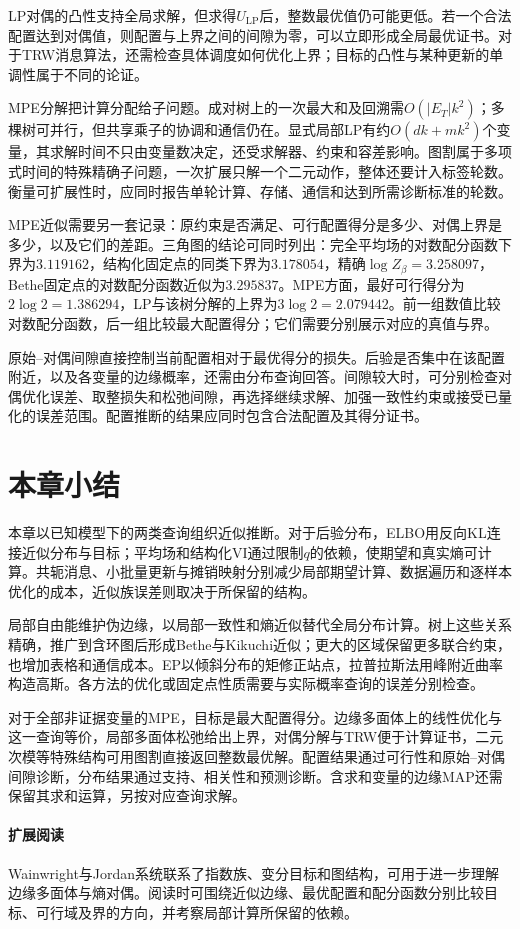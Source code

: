 LP对偶的凸性支持全局求解，但求得$U_{\mathrm{LP}}$后，整数最优值仍可能更低。若一个合法配置达到对偶值，则配置与上界之间的间隙为零，可以立即形成全局最优证书。对于TRW消息算法，还需检查具体调度如何优化上界；目标的凸性与某种更新的单调性属于不同的论证。

MPE分解把计算分配给子问题。成对树上的一次最大和及回溯需$O(|E_T|k^2)$；多棵树可并行，但共享乘子的协调和通信仍在。显式局部LP有约$O(dk+mk^2)$个变量，其求解时间不只由变量数决定，还受求解器、约束和容差影响。图割属于多项式时间的特殊精确子问题，一次扩展只解一个二元动作，整体还要计入标签轮数。衡量可扩展性时，应同时报告单轮计算、存储、通信和达到所需诊断标准的轮数。

MPE近似需要另一套记录：原约束是否满足、可行配置得分是多少、对偶上界是多少，以及它们的差距。三角图的结论可同时列出：完全平均场的对数配分函数下界为$3.119162$，结构化固定点的同类下界为$3.178054$，精确$\log Z_\beta=3.258097$，Bethe固定点的对数配分函数近似为$3.295837$。MPE方面，最好可行得分为$2\log2=1.386294$，LP与该树分解的上界为$3\log2=2.079442$。前一组数值比较对数配分函数，后一组比较最大配置得分；它们需要分别展示对应的真值与界。

原始--对偶间隙直接控制当前配置相对于最优得分的损失。后验是否集中在该配置附近，以及各变量的边缘概率，还需由分布查询回答。间隙较大时，可分别检查对偶优化误差、取整损失和松弛间隙，再选择继续求解、加强一致性约束或接受已量化的误差范围。配置推断的结果应同时包含合法配置及其得分证书。

\section{本章小结}
\label{sec:pgm-variational-summary}

本章以已知模型下的两类查询组织近似推断。对于后验分布，ELBO用反向KL连接近似分布与目标；平均场和结构化VI通过限制$q$的依赖，使期望和真实熵可计算。共轭消息、小批量更新与摊销映射分别减少局部期望计算、数据遍历和逐样本优化的成本，近似族误差则取决于所保留的结构。

局部自由能维护伪边缘，以局部一致性和熵近似替代全局分布计算。树上这些关系精确，推广到含环图后形成Bethe与Kikuchi近似；更大的区域保留更多联合约束，也增加表格和通信成本。EP以倾斜分布的矩修正站点，拉普拉斯法用峰附近曲率构造高斯。各方法的优化或固定点性质需要与实际概率查询的误差分别检查。

对于全部非证据变量的MPE，目标是最大配置得分。边缘多面体上的线性优化与这一查询等价，局部多面体松弛给出上界，对偶分解与TRW便于计算证书，二元次模等特殊结构可用图割直接返回整数最优解。配置结果通过可行性和原始--对偶间隙诊断，分布结果通过支持、相关性和预测诊断。含求和变量的边缘MAP还需保留其求和运算，另按对应查询求解。

\paragraph{扩展阅读}
Wainwright与Jordan系统联系了指数族、变分目标和图结构，可用于进一步理解边缘多面体与熵对偶。阅读时可围绕近似边缘、最优配置和配分函数分别比较目标、可行域及界的方向，并考察局部计算所保留的依赖。